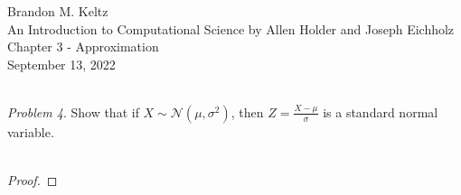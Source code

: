 \documentclass{article}
\begin{document}
	\begin{flushleft}

		Brandon M. Keltz\\
		An Introduction to Computational Science by Allen Holder and Joseph Eichholz\\
		Chapter 3 - Approximation\\
		September 13, 2022\\\

		\textit{Problem 4}. Show that if $X \sim \mathcal{N}\left( \mu, \sigma^2 \right)$, then $Z = \frac{X - \mu}{\sigma}$ is a standard normal variable. \\\

		\begin{proof}

			

		\end{proof}

	\end{flushleft}
\end{document}
